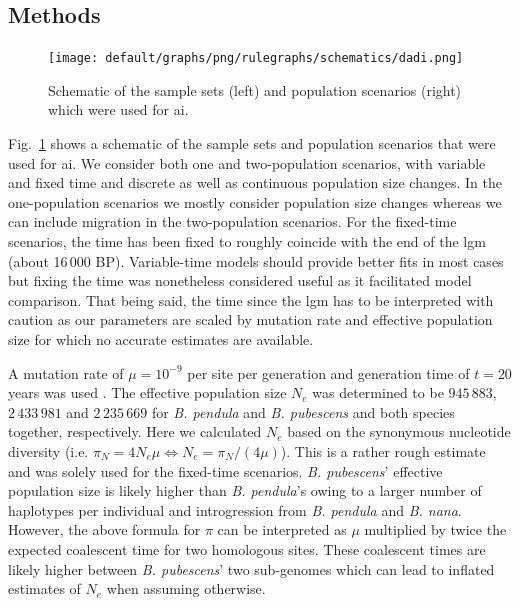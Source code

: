 \documentclass[hidelinks,11pt]{article}
\newcommand{\dadi}{\textdelta a\textdelta i}
\newcommand{\pendula}{\textit{B. pendula}}
\newcommand{\pubescens}{\textit{B. pubescens}}
\newcommand{\nana}{\textit{B. nana}}
\begin{document}
    \subsection{Methods}

    \begin{figure}[ht]
        \centering
        \texttt{[image: default/graphs/png/rulegraphs/schematics/dadi.png]}
        \caption{Schematic of the sample sets (left) and population scenarios (right) which were used for \dadi.}
        \label{fig:schematic_scenarios_dadi}
    \end{figure}

    Fig.~\ref{fig:schematic_scenarios_dadi} shows a schematic of the sample sets and population scenarios that were used for \dadi. We consider both one and two-population scenarios, with variable and fixed time and discrete as well as continuous population size changes. In the one-population scenarios we mostly consider population size changes whereas we can include migration in the two-population scenarios. For the fixed-time scenarios, the time has been fixed to roughly coincide with the end of the \acrlong{lgm} (about 16\,000 BP). Variable-time models should provide better fits in most cases but fixing the time was nonetheless considered useful as it facilitated model comparison. That being said, the time since the \acrshort{lgm} has to be interpreted with caution as our parameters are scaled by mutation rate and effective population size for which no accurate estimates are available.

    A mutation rate of $\mu = 10^{-9}$ per site per generation and generation time of $t=20$ years was used \cite{jarkko}. The effective population size $N_e$ was determined to be $945\,883$, $2\,433\,981$ and $2\,235\,669$ for \pendula{} and \pubescens{} and both species together, respectively. Here we calculated $N_e$ based on the synonymous nucleotide diversity (i.e. $\pi_N = 4 N_e \mu \Leftrightarrow N_e = \pi_N/(4\mu)$). This is a rather rough estimate and was solely used for the fixed-time scenarios. \pubescens{}' effective population size is likely higher than \pendula{}'s owing to a larger number of haplotypes per individual and introgression from \pendula{} and \nana{}. However, the above formula for $\pi$ can be interpreted as $\mu$ multiplied by twice the expected coalescent time for two homologous sites. These coalescent times are likely higher between \pubescens{}' two sub-genomes which can lead to inflated estimates of $N_e$ when assuming otherwise.
\end{document}
